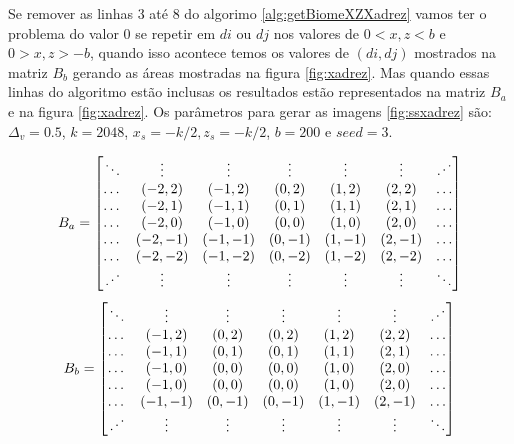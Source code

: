 Se remover as linhas 3 até 8 do algorimo \ref{alg:getBiomeXZXadrez} vamos ter o 
problema do valor $0$ se repetir em $di$ ou $dj$ nos valores de $0 < x, z < b$ e $0 > x, z > -b$, 
quando isso acontece temos os valores de $(di, dj)$ mostrados na
matriz $B_{b}$ gerando as áreas mostradas na figura \ref{fig:xadrez}. Mas quando essas
linhas do algoritmo estão inclusas os resultados estão representados na matriz $B_{a}$
e na figura \ref{fig:xadrez}. Os parâmetros para gerar as
imagens \ref{fig:ssxadrez} são: $\Delta_{v} = 0.5$, 
$k = 2048$, $ x_{s} = -k/2 , z_{s} = -k/2$, $b = 200$ e $seed = 3$.

\[
B_{a} = 
\begin{bmatrix}
    \ddots                & \vdots & \vdots & \vdots & \vdots & \vdots & \reflectbox{$\ddots$} \\
    \dots                 &(-2, 2) &(-1, 2) &(0, 2)  &(1, 2)  &(2, 2)  & \dots                 \\
    \dots                 &(-2, 1) &(-1, 1) &(0, 1)  &(1, 1)  &(2, 1)  & \dots                 \\
    \dots                 &(-2, 0) &(-1, 0) &(0, 0)  &(1, 0)  &(2, 0)  & \dots                 \\
    \dots                 &(-2, -1)&(-1, -1)&(0, -1) &(1, -1) &(2, -1) & \dots                 \\
    \dots                 &(-2, -2)&(-1, -2)&(0, -2) &(1, -2) &(2, -2) & \dots                 \\
    \reflectbox{$\ddots$} & \vdots & \vdots & \vdots & \vdots & \vdots & \ddots                \\
    
\end{bmatrix}
\]
\[
B_{b} = 
\begin{bmatrix}
    \ddots                & \vdots & \vdots & \vdots & \vdots & \vdots & \reflectbox{$\ddots$} \\
    \dots                 &(-1, 2) &(0, 2)  &(0, 2)  &(1, 2)  &(2, 2)  & \dots                 \\
    \dots                 &(-1, 1) &(0, 1)  &(0, 1)  &(1, 1)  &(2, 1)  & \dots                 \\
    \dots                 &(-1, 0) &(0, 0)  &(0, 0)  &(1, 0)  &(2, 0)  & \dots                 \\
    \dots                 &(-1, 0) &(0, 0)  &(0, 0)  &(1, 0)  &(2, 0) & \dots                 \\
    \dots                 &(-1, -1)&(0, -1) &(0, -1) &(1, -1) &(2, -1) & \dots                 \\
    \reflectbox{$\ddots$} & \vdots & \vdots & \vdots & \vdots & \vdots & \ddots                \\
    
\end{bmatrix}
\]


